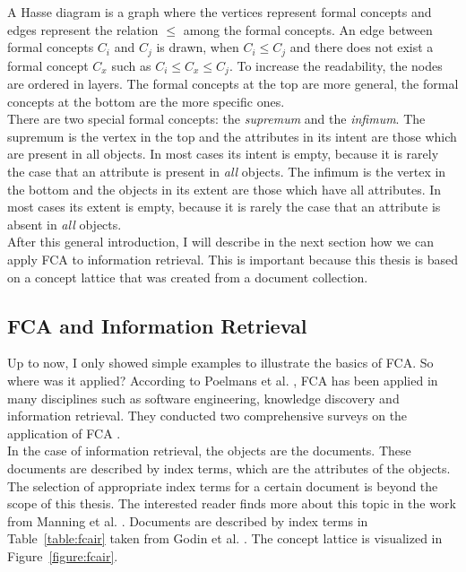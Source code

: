 \documentclass[11pt]{report}
\begin{document}
A Hasse diagram is a graph where the vertices represent formal concepts and edges represent the relation $\le$ among the formal concepts. An edge between formal concepts $C_i$ and $C_j$ is drawn, when $C_i \le C_j$ and there does not exist a formal concept $C_x$ such as $C_i \le C_x \le C_j$. To increase the readability, the nodes are ordered in layers. The formal concepts at the top are more general, the formal concepts at the bottom are the more specific ones.\\

There are two special formal concepts: the \textit{supremum} and the \textit{infimum}. The supremum is the vertex in the top and the attributes in its intent are those which are present in all objects. In most cases its intent is empty, because it is rarely the case that an attribute is present in \textit{all} objects. The infimum is the vertex in the bottom and the objects in its extent are those which have all attributes. In most cases its extent is empty, because it is rarely the case that an attribute is absent in \textit{all} objects.\\

After this general introduction, I will describe in the next section how we can apply FCA to information retrieval. This is important because this thesis is based on a concept lattice that was created from a document collection.

\subsection{FCA and Information Retrieval}
\label{section:fcair}

Up to now, I only showed simple examples to illustrate the basics of FCA. So where was it applied? According to Poelmans et al. \cite{Poelmans2013}, FCA has been applied in many disciplines such as software engineering, knowledge discovery and information retrieval. They conducted two comprehensive surveys on the application of FCA \cite{Poelmans2013, Poelmans2013b}.\\

In the case of information retrieval, the objects are the documents. These documents are described by index terms, which are the attributes of the objects. The selection of appropriate index terms for a certain document is beyond the scope of this thesis. The interested reader finds more about this topic in the work from Manning et al. \cite{manning2008introduction}. Documents are described by index terms in Table~\ref{table:fcair} taken from Godin et al. \cite{Godin1993}. The concept lattice is visualized in Figure~\ref{figure:fcair}.
\end{document}
